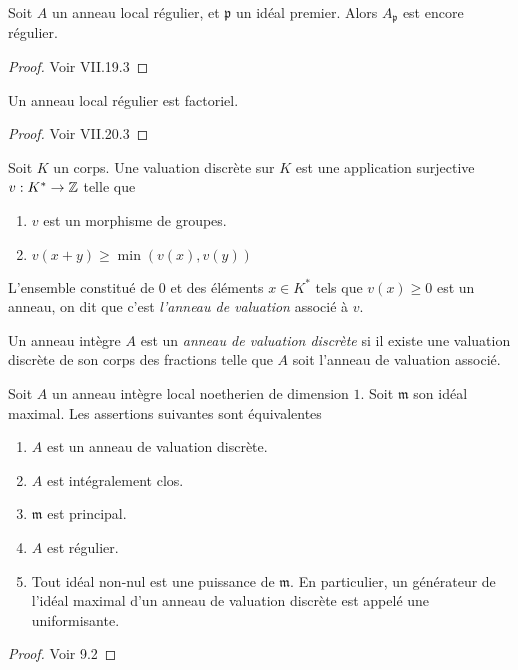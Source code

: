 \begin{thm}
Soit $A$ un anneau local régulier, et $\mathfrak{p}$ un idéal premier. Alors $A_\mathfrak{p}$ est encore régulier.
\end{thm}
\begin{proof}
Voir \cite{Matsumura} VII.19.3
\end{proof}

\begin{thm}\label{reglocufd}
Un anneau local régulier est factoriel.
\end{thm}
\begin{proof}
Voir \cite{Matsumura} VII.20.3
\end{proof}

\begin{defn}
Soit $K$ un corps. Une valuation discrète sur $K$ est une application surjective $v:K^*\rightarrow \mathbb{Z}$ telle que
\begin{enumerate}
\item $v$ est un morphisme de groupes.
\item $v(x+y)\geq \min(v(x),v(y))$
\end{enumerate}
L'ensemble constitué de $0$ et des éléments $x\in K^*$ tels que $v(x)\geq 0$ est un anneau, on dit que c'est \textit{l'anneau de valuation} associé à $v$.
\end{defn}

\begin{defn}
Un anneau intègre $A$ est un \textit{anneau de valuation discrète} si il existe une valuation discrète de son corps des fractions telle que $A$ soit l'anneau de valuation associé.
\end{defn}

\begin{prop}
Soit $A$ un anneau intègre local noetherien de dimension $1$. Soit $\mathfrak{m}$ son idéal maximal. Les assertions suivantes sont équivalentes
\begin{enumerate}
\item $A$ est un anneau de valuation discrète.
\item $A$ est intégralement clos.
\item $\mathfrak{m}$ est principal.
\item $A$ est régulier.
\item Tout idéal non-nul est une puissance de $\mathfrak{m}$.
En particulier, un générateur de l'idéal maximal d'un anneau de valuation discrète est appelé une uniformisante.
\end{enumerate}
\end{prop}
\begin{proof}
Voir \cite{atiyahmacdo} 9.2
\end{proof}


